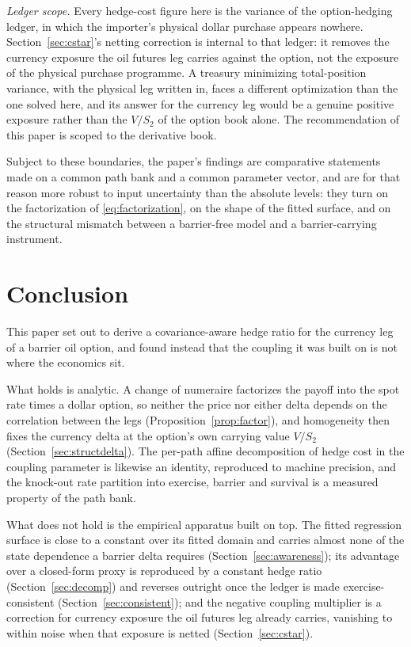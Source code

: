 \documentclass[11pt,a4paper]{article}
\begin{document}
\emph{Ledger scope.} Every hedge-cost figure here is the variance of the option-hedging ledger, in which the importer's physical dollar purchase appears nowhere. Section~\ref{sec:cstar}'s netting correction is internal to that ledger: it removes the currency exposure the oil futures leg carries against the option, not the exposure of the physical purchase programme. A treasury minimizing total-position variance, with the physical leg written in, faces a different optimization than the one solved here, and its answer for the currency leg would be a genuine positive exposure rather than the $V/S_2$ of the option book alone. The recommendation of this paper is scoped to the derivative book.

Subject to these boundaries, the paper's findings are comparative statements made on a common path bank and a common parameter vector, and are for that reason more robust to input uncertainty than the absolute levels: they turn on the factorization of \eqref{eq:factorization}, on the shape of the fitted surface, and on the structural mismatch between a barrier-free model and a barrier-carrying instrument.

\section{Conclusion}
\label{sec:conclusion}

This paper set out to derive a covariance-aware hedge ratio for the currency leg of a barrier oil option, and found instead that the coupling it was built on is not where the economics sit.

What holds is analytic. A change of numeraire factorizes the payoff into the spot rate times a dollar option, so neither the price nor either delta depends on the correlation between the legs (Proposition~\ref{prop:factor}), and homogeneity then fixes the currency delta at the option's own carrying value $V/S_2$ (Section~\ref{sec:structdelta}). The per-path affine decomposition of hedge cost in the coupling parameter is likewise an identity, reproduced to machine precision, and the knock-out rate partition into exercise, barrier and survival is a measured property of the path bank.

What does not hold is the empirical apparatus built on top. The fitted regression surface is close to a constant over its fitted domain and carries almost none of the state dependence a barrier delta requires (Section~\ref{sec:awareness}); its advantage over a closed-form proxy is reproduced by a constant hedge ratio (Section~\ref{sec:decomp}) and reverses outright once the ledger is made exercise-consistent (Section~\ref{sec:consistent}); and the negative coupling multiplier is a correction for currency exposure the oil futures leg already carries, vanishing to within noise when that exposure is netted (Section~\ref{sec:cstar}).
\end{document}
